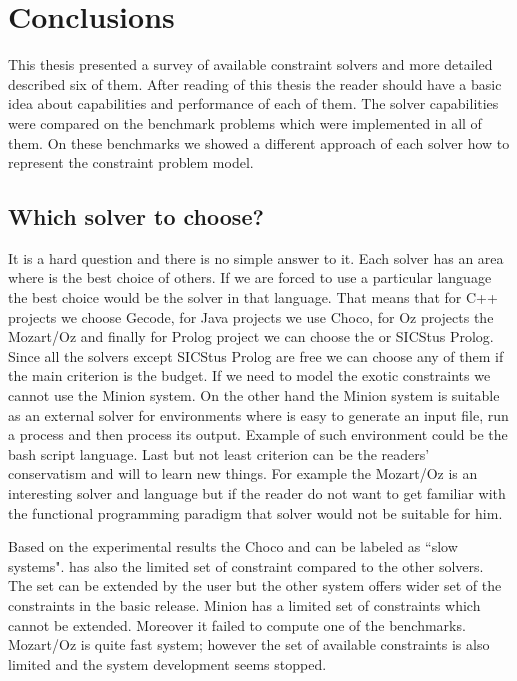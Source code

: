 \chapter{Conclusions}

This thesis presented a survey of available constraint solvers and more detailed 
described six of them. After reading of this thesis the reader should have a 
basic idea about capabilities and performance of each of them. The solver capabilities 
were compared on the benchmark problems which were implemented in all of them.
On these benchmarks we showed a different approach of each solver how to represent
the constraint problem model. 
 
\section{Which solver to choose?}
It is a hard question and there is no simple answer to it. Each solver has an area where
is the best choice of others. If we are forced to use a particular language the best choice
would be the solver in that language. That means that for C++ projects we choose Gecode,
for Java projects we use Choco, for Oz projects the Mozart/Oz and finally for Prolog
project we can choose the \eclipse or SICStus Prolog. Since all the solvers except SICStus Prolog are free
we can choose any of them if the main criterion is the budget. If we need to model the
exotic constraints we cannot use the Minion system. On the other hand the Minion system
is suitable as an external solver for environments where is easy to generate an input
file, run a process and then process its output. Example of such environment could
be the bash script language. Last but not least criterion can be the readers' conservatism and 
will to learn new things. For example the Mozart/Oz is an interesting solver and language
but if the reader do not want to get familiar with the functional programming paradigm that solver would
not be suitable for him.

Based on the experimental results the Choco and \eclipse can be labeled as ``slow systems".
\eclipse has also the limited set of constraint compared to the other solvers. The 
set can be extended by the user but the other system offers wider set of the 
constraints in the basic release. Minion has a limited set of constraints which 
cannot be extended. Moreover it failed to compute one of the benchmarks. Mozart/Oz
is quite fast system; however the set of available constraints is also limited and
the system development seems stopped.

